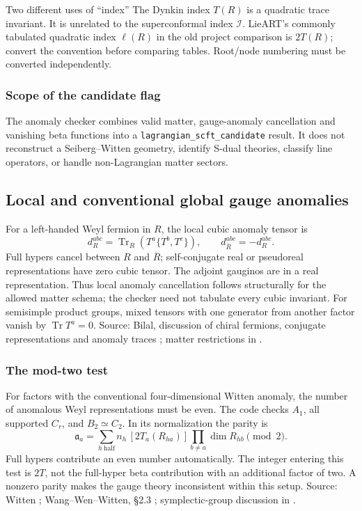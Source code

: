 \documentclass[11pt,a4paper]{article}
\numberwithin{equation}{section}
\newcommand{\code}[1]{{\small\nolinkurl{#1}}}
\newcommand{\Tr}{\operatorname{Tr}}
\newcommand{\src}[1]{{\small\color{muted}Source: #1.}\par}
\begin{document}
\begin{note}{Two different uses of ``index''}
The Dynkin index $T(R)$ is a quadratic trace invariant. It is unrelated to the
superconformal index $\mathcal I$. LieART's commonly tabulated quadratic index
$\ell(R)$ in the old project comparison is $2T(R)$; convert the convention
before comparing tables. Root/node numbering must be converted independently.
\end{note}

\subsubsection{Scope of the candidate flag}
The anomaly checker combines valid matter, gauge-anomaly cancellation and
vanishing beta functions into a \code{lagrangian_scft_candidate} result.
It does not reconstruct a Seiberg--Witten geometry, identify S-dual theories,
classify line operators, or handle non-Lagrangian matter sectors.

\clearpage
\subsection{Local and conventional global gauge anomalies}
For a left-handed Weyl fermion in $R$, the local cubic anomaly tensor is
\begin{equation}
 d_R^{abc}=\Tr_R\!\left(T^a\{T^b,T^c\}\right),\qquad
 d_{\overline R}^{abc}=-d_R^{abc}.
 \label{eq:cubic}
\end{equation}
Full hypers cancel between $R$ and $\overline R$; self-conjugate real or
pseudoreal representations have zero cubic tensor. The adjoint gauginos are in
a real representation. Thus local anomaly cancellation follows structurally for
the allowed matter schema; the checker need not tabulate every cubic invariant.
For semisimple product groups, mixed tensors with one generator from another
factor vanish by $\Tr T^a=0$.
\src{Bilal, discussion of chiral fermions, conjugate representations and anomaly
traces \cite{bilal}; matter restrictions in \cite{bt}}

\subsubsection{The mod-two test}
For factors with the conventional four-dimensional Witten anomaly, the number
of anomalous Weyl representations must be even. The code checks $A_1$, all
supported $C_r$, and $B_2\simeq C_2$. In its normalization the parity is
\begin{equation}
 \mathfrak a_a=
 \sum_{h\ \mathrm{half}} n_h\,[2T_a(R_{ha})]
 \prod_{b\ne a}\dim R_{hb}\pmod2.
 \label{eq:witten}
\end{equation}
Full hypers contribute an even number automatically. The integer entering this
test is $2T$, not the full-hyper beta contribution with an additional factor of
two. A nonzero parity makes the gauge theory inconsistent within this setup.
\src{Witten \cite{witten}; Wang--Wen--Witten, \S2.3 \cite{www};
symplectic-group discussion in \cite{bt,df}}
\end{document}
